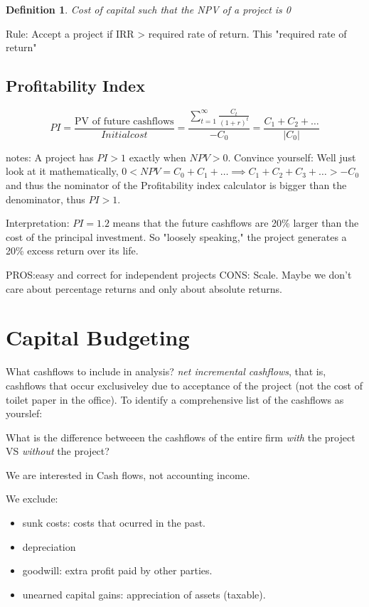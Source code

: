 \documentclass{article}
\newtheorem{definition}{Definition}
\begin{document}
\begin{definition}
Cost of capital such that the NPV of a project is 0
\end{definition}

Rule: Accept a project if IRR > required rate of return. This "required rate of return" 

\subsection{Profitability Index}
\[ 
PI = 
\frac{\text{PV of future cashflows}}{{Initial cost}} 
= \frac{\sum_{t=1}^{\infty}\frac{C_t}{(1+r)^t}}{-C_0}
= \frac{C_1 + C_2 + \dots}{|C_0|}
 \]
 
notes:
A project has $PI > 1$ exactly when $NPV > 0$. Convince yourself: Well just look at it mathematically, $ 0  < NPV = C_0 + C_1 + \dots \implies C_1 + C_2 + C_3 + \dots > -C_0$ and thus the nominator of the Profitability index calculator is bigger than the denominator, thus $PI>1$. 


Interpretation: $PI = 1.2$ means that the future cashflows are 20\% larger than the cost of the principal investment. So "loosely speaking," the project generates a 20\% excess return over its life. 

PROS:easy and correct for independent projects 
CONS: Scale. Maybe we don't care about percentage returns and only about absolute returns. 

\section{Capital Budgeting}
What cashflows to include in analysis? \textit{net incremental cashflows}, that is, cashflows that occur exclusiveley due to acceptance of the project (not the cost of toilet paper in the office). To identify a comprehensive list of the cashflows as yourslef: 
\begin{center}
What is the difference betweeen the cashflows of the entire firm \textit{with} the project VS \textit{without} the project?
\end{center}

We are interested in Cash flows, not accounting income. 

We exclude:
\begin{itemize}
\item sunk costs: costs that ocurred in the past. 
\item depreciation
\item goodwill: extra profit paid by other parties.
\item unearned capital gains: appreciation of assets (taxable).
\end{itemize}
\end{document}
